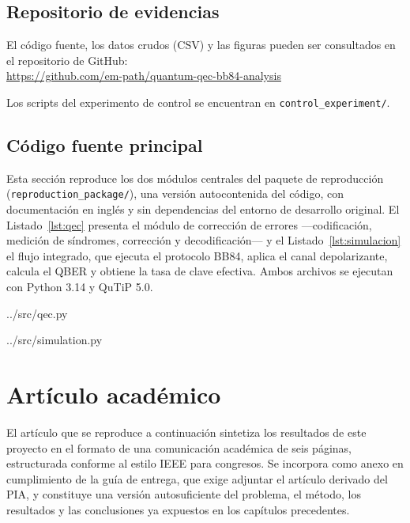 \documentclass[12pt]{report}
\begin{document}
\section{Repositorio de evidencias}
El código fuente, los datos crudos (CSV) y las figuras pueden ser consultados en el repositorio de GitHub: \\
\url{https://github.com/em-path/quantum-qec-bb84-analysis}

Los scripts del experimento de control se encuentran en
\texttt{control\_experiment/}.

\section{Código fuente principal}

Esta sección reproduce los dos módulos centrales del paquete de reproducción
(\texttt{reproduction\_package/}), una versión autocontenida del código, con
documentación en inglés y sin dependencias del entorno de desarrollo original.
El Listado~\ref{lst:qec} presenta el módulo de corrección de errores
---codificación, medición de síndromes, corrección y decodificación--- y el
Listado~\ref{lst:simulacion} el flujo integrado, que ejecuta el protocolo BB84,
aplica el canal depolarizante, calcula el QBER y obtiene la tasa de clave
efectiva. Ambos archivos se ejecutan con Python 3.14 y QuTiP 5.0.

\newpage


    {../src/qec.py}

\newpage


    {../src/simulation.py}

\chapter{Artículo académico}
\label{anexo:articulo}

El artículo que se reproduce a continuación sintetiza los resultados de este
proyecto en el formato de una comunicación académica de seis páginas,
estructurada conforme al estilo IEEE para congresos. Se incorpora como anexo en
cumplimiento de la guía de entrega, que exige adjuntar el artículo derivado del
PIA, y constituye una versión autosuficiente del problema, el método, los
resultados y las conclusiones ya expuestos en los capítulos precedentes.
\end{document}
